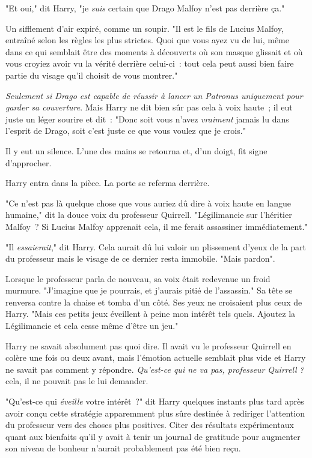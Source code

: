 "Et oui," dit Harry, "je \emph{suis} certain que Drago Malfoy n'est pas derrière ça."

Un sifflement d'air expiré, comme un soupir. "Il est le fils de Lucius Malfoy, entraîné selon les règles les plus strictes. Quoi que vous ayez vu de lui, même dans ce qui semblait être des moments à découverts où son masque glissait et où vous croyiez avoir vu la vérité derrière celui-ci~: tout cela peut aussi bien faire partie du visage qu'il choisit de vous montrer."

\emph{Seulement si Drago est capable de réussir à lancer un Patronus uniquement pour garder sa couverture}. Mais Harry ne dit bien sûr pas cela à voix haute~; il eut juste un léger sourire et dit~: "Donc soit vous n'avez \emph{vraiment} jamais lu dans l'esprit de Drago, soit c'est juste ce que vous voulez que je crois."

Il y eut un silence. L'une des mains se retourna et, d'un doigt, fit signe d'approcher.

Harry entra dans la pièce. La porte se referma derrière.

"Ce n'est pas là quelque chose que vous auriez dû dire à voix haute en langue humaine," dit la douce voix du professeur Quirrell. "Légilimancie sur l'héritier Malfoy~? Si Lucius Malfoy apprenait cela, il me ferait assassiner immédiatement."

"Il \emph{essaierait}," dit Harry. Cela aurait dû lui valoir un plissement d'yeux de la part du professeur mais le visage de ce dernier resta immobile. "Mais pardon".

Lorsque le professeur parla de nouveau, sa voix était redevenue un froid murmure. "J'imagine que je pourrais, et j'aurais pitié de l'assassin." Sa tête se renversa contre la chaise et tomba d'un côté. Ses yeux ne croisaient plus ceux de Harry. "Mais ces petits jeux éveillent à peine mon intérêt tels quels. Ajoutez la Légilimancie et cela cesse même d'être un jeu."

Harry ne savait absolument pas quoi dire. Il avait vu le professeur Quirrell en colère une fois ou deux avant, mais l'émotion actuelle semblait plus vide et Harry ne savait pas comment y répondre. \emph{Qu'est-ce qui ne va pas, professeur Quirrell} \emph{?} cela, il ne pouvait pas le lui demander.

"Qu'est-ce qui \emph{éveille} votre intérêt~?" dit Harry quelques instants plus tard après avoir conçu cette stratégie apparemment plus sûre destinée à rediriger l'attention du professeur vers des choses plus positives. Citer des résultats expérimentaux quant aux bienfaits qu'il y avait à tenir un journal de gratitude pour augmenter son niveau de bonheur n'aurait probablement pas été bien reçu.

